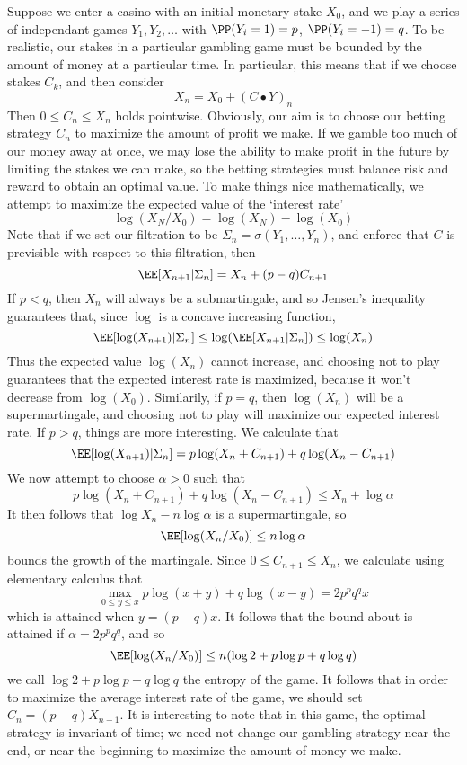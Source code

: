 \begin{example}
    Suppose we enter a casino with an initial monetary stake $X_0$, and we play a series of independant games $Y_1, Y_2, \dots$ with $\PP(Y_i = 1) = p$, $\PP(Y_i = -1) = q$. To be realistic, our stakes in a particular gambling game must be bounded by the amount of money at a particular time. In particular, this means that if we choose stakes $C_k$, and then consider
    \[ X_n = X_0 + (C \bullet Y)_n \]
    Then $0 \leq C_n \leq X_n$ holds pointwise. Obviously, our aim is to choose our betting strategy $C_n$ to maximize the amount of profit we make. If we gamble too much of our money away at once, we may lose the ability to make profit in the future by limiting the stakes we can make, so the betting strategies must balance risk and reward to obtain an optimal value. To make things nice mathematically, we attempt to maximize the expected value of the `interest rate'
    \[ \log(X_N/X_0) = \log(X_N) - \log(X_0) \]
    Note that if we set our filtration to be $\Sigma_n = \sigma(Y_1, \dots, Y_n)$, and enforce that $C$ is previsible with respect to this filtration, then
    \[ \EE[X_{n+1}|\Sigma_n] = X_n + (p-q)C_{n+1} \]
    If $p < q$, then $X_n$ will always be a submartingale, and so Jensen's inequality guarantees that, since $\log$ is a concave increasing function,
    \[ \EE[\log(X_{n+1})|\Sigma_n] \leq \log(\EE[X_{n+1}|\Sigma_n]) \leq \log(X_n) \]
    Thus the expected value $\log(X_n)$ cannot increase, and choosing not to play guarantees that the expected interest rate is maximized, because it won't decrease from $\log(X_0)$. Similarily, if $p = q$, then $\log(X_n)$ will be a supermartingale, and choosing not to play will maximize our expected interest rate. If $p > q$, things are more interesting. We calculate that
    \[ \EE[\log(X_{n+1})|\Sigma_n] = p\log(X_n + C_{n+1}) + q\log(X_n - C_{n+1}) \]
    We now attempt to choose $\alpha > 0$ such that
    \[ p \log(X_n + C_{n+1}) + q\log(X_n - C_{n+1}) \leq X_n + \log \alpha \]
    It then follows that $\log X_n - n \log \alpha$ is a supermartingale, so
    \[ \EE[\log(X_n/X_0)] \leq n \log \alpha \]
    bounds the growth of the martingale. Since $0 \leq C_{n+1} \leq X_n$, we calculate using elementary calculus that
    \[ \max_{0 \leq y \leq x} p\log(x + y) + q\log(x-y) = 2p^p q^q x \]
    which is attained when $y = (p-q)x$. It follows that the bound about is attained if $\alpha = 2p^pq^q$, and so
    \[ \EE[\log(X_n/X_0)] \leq n (\log 2 + p \log p + q \log q) \]
    we call $\log 2 + p \log p + q \log q$ the entropy of the game. It follows that in order to maximize the average interest rate of the game, we should set $C_n = (p-q)X_{n-1}$. It is interesting to note that in this game, the optimal strategy is invariant of time; we need not change our gambling strategy near the end, or near the beginning to maximize the amount of money we make.
\end{example}

